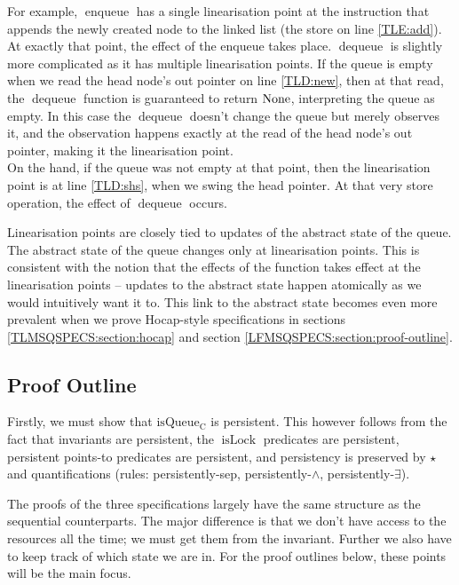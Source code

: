 \documentclass[a4paper, 10pt]{report}
\theoremstyle{definition}
\newcommand{\isLock}{\operatorname{isLock}}
\newcommand{\enqueue}{\operatorname{enqueue}}
\newcommand{\dequeue}{\operatorname{dequeue}}
\newcommand{\isqueueconc}{\operatorname{isQueue_{C}}}
\begin{document}
For example, $\enqueue$ has a single linearisation point at the instruction that appends the newly created node to the linked list (the store on line \ref{TLE:add}). At exactly that point, the effect of the enqueue takes place. $\dequeue$ is slightly more complicated as it has multiple linearisation points. If the queue is empty when we read the head node's out pointer on line \ref{TLD:new}, then at that read, the $\dequeue$ function is guaranteed to return $\operatorname{None}$, interpreting the queue as empty. In this case the $\dequeue$ doesn't change the queue but merely observes it, and the observation happens exactly at the read of the head node's out pointer, making it the linearisation point.\\
On the hand, if the queue was not empty at that point, then the linearisation point is at line \ref{TLD:shs}, when we swing the head pointer. At that very store operation, the effect of $\dequeue$ occurs.

Linearisation points are closely tied to updates of the abstract state of the queue. The abstract state of the queue changes only at linearisation points. This is consistent with the notion that the effects of the function takes effect at the linearisation points -- updates to the abstract state happen atomically as we would intuitively want it to. This link to the abstract state becomes even more prevalent when we prove Hocap-style specifications in sections \ref{TLMSQSPECS:section:hocap} and section \ref{LFMSQSPECS:section:proof-outline}.

\subsection{Proof Outline}
\label{TLMSQSPECS:concurrent:sub:proof-outline}
Firstly, we must show that $\isqueueconc$ is persistent. This however follows from the fact that invariants are persistent, the $\isLock$ predicates are persistent, persistent points-to predicates are persistent, and persistency is preserved by $\star{}$ and quantifications (rules: persistently-sep, persistently-$\land{}$, persistently-$\exists$).

The proofs of the three specifications largely have the same structure as the sequential counterparts. The major difference is that we don't have access to the resources all the time; we must get them from the invariant. Further we also have to keep track of which state we are in. For the proof outlines below, these points will be the main focus.
\end{document}
